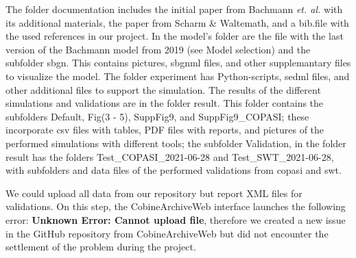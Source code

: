 The folder documentation includes the initial paper from Bachmann \textit{et. al.}  with its additional materials, the paper from Scharm \& Waltemath, and a \textsf{bib.file} with the used references in our project. In the model's folder are the file with the last version of the Bachmann model from 2019 (see Model selection) and the subfolder \textsf{sbgn}. This contains pictures, \ac{sbgnml} files, and other supplemantary files to visualize the model. The folder experiment has Python-scripts, \ac{sedml} files, and other additional files to support the simulation. The results of the different simulations and validations are in the folder result. This folder contains the subfolders Default, Fig(3 - 5), SuppFig9, and SuppFig9\_COPASI; these incorporate \ac{csv} files with tables, PDF files with reports, and pictures of the performed simulations with different tools; the subfolder Validation, in the folder result has the folders Test\_COPASI\_2021-06-28 and Test\_SWT\_2021-06-28, with subfolders and data files of the performed validations from \ac{copasi} and \ac{swt}.

We could upload all data from our repository but report XML files for validations. On this step, the CobineArchiveWeb interface launches the following error: \textbf{Unknown Error: Cannot upload file}, therefore we created a new issue in the GitHub repository from CobineArchiveWeb but did not encounter the settlement of the problem during the project.